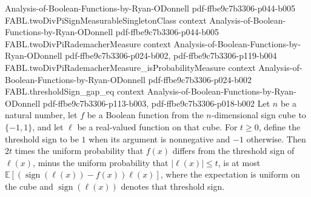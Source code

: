 \begin{theorem}
  {Analysis-of-Boolean-Functions-by-Ryan-ODonnell}
  {pdf-ffbe9c7b3306-p044-b005}
\proofstep
  {FABL.twoDivPiSignMeasurableSingletonClass}
  {context}
  {Analysis-of-Boolean-Functions-by-Ryan-ODonnell}
  {pdf-ffbe9c7b3306-p044-b005}
\proofstep
  {FABL.twoDivPiRademacherMeasure}
  {context}
  {Analysis-of-Boolean-Functions-by-Ryan-ODonnell}
  {pdf-ffbe9c7b3306-p024-b002,
    pdf-ffbe9c7b3306-p119-b004}
\proofstep
  {FABL.twoDivPiRademacherMeasure_isProbabilityMeasure}
  {context}
  {Analysis-of-Boolean-Functions-by-Ryan-ODonnell}
  {pdf-ffbe9c7b3306-p024-b002}
\proofstep
  {FABL.thresholdSign_gap_eq}
  {context}
  {Analysis-of-Boolean-Functions-by-Ryan-ODonnell}
  {pdf-ffbe9c7b3306-p113-b003,
    pdf-ffbe9c7b3306-p018-b002}
Let $n$ be a natural number, let $f$ be a Boolean function from the $n$-dimensional sign
cube to $\{-1,1\}$, and let $\ell$ be a real-valued function on that cube. For $t\geq0$,
define the threshold sign to be $1$ when its argument is nonnegative and $-1$ otherwise.
Then $2t$ times the uniform probability that $f(x)$ differs from the threshold sign of
$\ell(x)$, minus the uniform probability that $|\ell(x)|\leq t$, is at most
$\mathbb{E}[(\operatorname{sign}(\ell(x))-f(x))\ell(x)]$, where the expectation is
uniform on the cube and $\operatorname{sign}(\ell(x))$ denotes that threshold sign.
\end{theorem}

